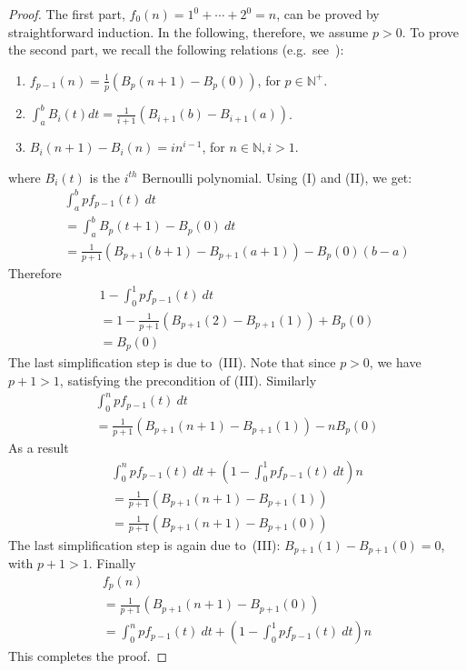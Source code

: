 \documentclass[a4paper,10pt]{amsart}
\theoremstyle{remark}
\newcommand{\nat}{\mathbb{N}}
\begin{document}
\begin{proof}
The first part, $f_0(n)=1^0+\cdots+2^0=n$, can be proved by
straightforward induction. In the following, therefore, we assume
$p>0$. To prove the second part, we recall the following relations
(e.g.\ see~\cite[chapter 23]{mhandbook}):
\begin{enumerate}[I]
\item $f_{p-1}(n)=\frac{1}{p}(B_{p}(n+1)-B_{p}(0))$, for $p\in\nat^+$.
\item 
$\int_a^b B_i(t) dt = \frac{1}{i+1}(B_{i+1}(b)-B_{i+1}(a))$.
\item
$B_i(n+1)-B_i(n)=i n^{i-1}$, for $n\in\nat, i>1$.
\end{enumerate}
where $B_i(t)$ is the $i^\mathit{th}$ Bernoulli polynomial. 
Using (I) and (II), we get:
\[
\begin{array}{l}
\int_a^b p f_{p-1}(t)\ dt\\
=\int_a^b B_{p}(t+1)-B_{p}(0)\ dt\\
=\frac{1}{p+1}(B_{p+1}(b+1)-B_{p+1}(a+1))- B_p(0) (b-a)
\end{array}
\]
Therefore
\[
\begin{array}{l}
1-\int^1_0 p f_{p-1}(t)\ dt\\
=1-\frac{1}{p+1}(B_{p+1}(2)-B_{p+1}(1))+ B_p(0)\\
=B_p(0)
\end{array}
\]
The last simplification step is due to~(III). Note that since $p>0$, we
have $p+1>1$, satisfying the precondition of (III).
Similarly
\[
\begin{array}{l}
\int^n_0 p f_{p-1}(t)\ dt\\
=\frac{1}{p+1}(B_{p+1}(n+1)-B_{p+1}(1))-n B_p(0)
\end{array}
\]
As a result
\[
\begin{array}{l}
\int^n_0 p f_{p-1}(t)\ dt + (1-\int^1_0 p
f_{p-1}(t)\ dt)n\\
=\frac{1}{p+1}(B_{p+1}(n+1)-B_{p+1}(1))\\
=\frac{1}{p+1}(B_{p+1}(n+1)-B_{p+1}(0))
\end{array}
\]
The last simplification step is again due to~(III):
$B_{p+1}(1)-B_{p+1}(0)=0$, with $p+1>1$.
Finally
\[
\begin{array}{l}
f_p(n) \\
= \frac{1}{p+1}(B_{p+1}(n+1)-B_{p+1}(0))\\
=\int^n_0 p f_{p-1}(t)\ dt + (1-\int^1_0 p
f_{p-1}(t)\ dt)n
\end{array}
\]
This completes the proof.
\end{proof}
\end{document}
